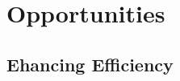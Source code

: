 \documentclass[fleqn,10pt]{SelfArx} %
\begin{document}











\section{Opportunities}

\subsection{Ehancing Efficiency}
\end{document}
